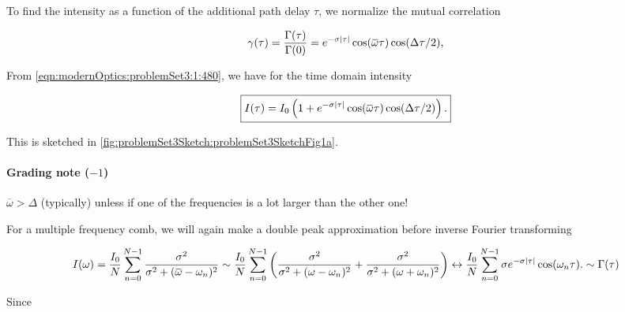 {To find the intensity as a function of the additional path delay $\tau$, we normalize the mutual correlation

\begin{dmath}\label{eqn:modernOptics:problemSet3:1:440}
\gamma(\tau)
= \frac{\Gamma(\tau)}{\Gamma(0)}
=
e^{-\sigma \Abs{\tau}}
\cos( \overbar{\omega} \tau ) \cos ( \Delta \tau /2 ),
\end{dmath}

From \ref{eqn:modernOptics:problemSet3:1:480}, we have for the time domain intensity

\begin{dmath}\label{eqn:modernOptics:problemSet3:1:460}
\boxed{
I(\tau) = I_0
\left( 1 +
e^{-\sigma \Abs{\tau}}
\cos( \overbar{\omega} \tau ) \cos ( \Delta \tau /2 )
\right).
}
\end{dmath}

This is sketched in \cref{fig:problemSet3Sketch:problemSet3SketchFig1a}.

\paragraph{Grading note ($-1$)}
$\overbar{\omega} > \Delta$ (typically) unless if one of the frequencies is a lot larger than the other one!




For a multiple frequency comb, we will again make a double peak approximation before inverse Fourier transforming

\begin{dmath}\label{eqn:modernOptics:problemSet3:1:500}
I(\omega)
=
\frac{I_0}{N} \sum_{n = 0}^{N-1} \frac{\sigma^2}{\sigma^2 + (\overbar{\omega} - \omega_n)^2}
\sim
\frac{I_0}{N} \sum_{n = 0}^{N-1}
\left(
\frac{\sigma^2}{\sigma^2 + (\omega - \omega_n)^2}
+\frac{\sigma^2}{\sigma^2 + (\omega + \omega_n)^2}
\right)
\leftrightarrow
\frac{I_0}{N} \sum_{n = 0}^{N-1}
\sigma e^{-\sigma \Abs{\tau} } \cos(\omega_n \tau).
\sim \Gamma(\tau)
\end{dmath}

Since

}
